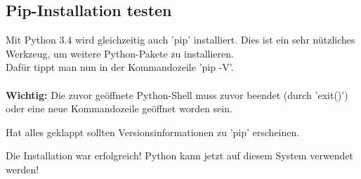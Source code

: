 \documentclass[ngerman,oneside, a4letter]{article}
\begin{document}
\subsection{Pip-Installation testen}
Mit Python 3.4 wird gleichzeitig auch 'pip' installiert. Dies ist ein sehr nützliches Werkzeug, um weitere Python-Pakete zu installieren.
\\
Dafür tippt man nun in der Kommandozeile 'pip -V'. 
\\
\\
\textbf{Wichtig:} Die zuvor geöffnete Python-Shell muss zuvor beendet (durch 'exit()') oder eine neue Kommandozeile geöffnet worden sein.
\begin{center}
\end{center}
Hat alles geklappt sollten Versionsinformationen zu 'pip' erscheinen.
\begin{center}
\end{center}


Die Installation war erfolgreich! Python kann jetzt auf diesem System verwendet werden!
\end{document}
